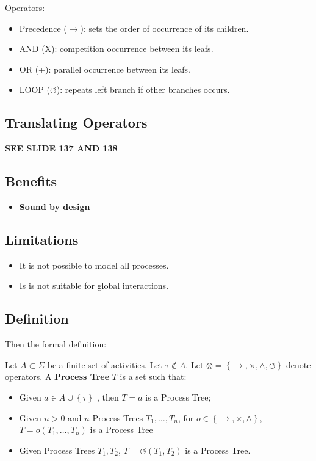 Operators:
\begin{itemize}
	\item Precedence ($\to $): sets the order of occurrence of its children.
	\item AND (X): competition occurrence between its leafs.
	\item OR (+): parallel occurrence between its leafs.
	\item LOOP ($\circlearrowleft$):  repeats left branch if other branches occurs.
\end{itemize}

\subsection*{Translating Operators}

\textbf{SEE SLIDE 137 AND 138}

\subsection*{Benefits}

\begin{itemize}
	\item \textbf{Sound by design}
\end{itemize}

\subsection*{Limitations}

\begin{itemize}
	\item It is not possible to model all processes.
	\item Is is not suitable for global interactions.
\end{itemize}

\subsection*{Definition}

Then the formal definition:

\begin{definition}
	Let $A\subset \Sigma$ be a finite set of activities. Let $\tau \not\in A $. Let $\otimes = \left\{ \to ,\times, \wedge, \circlearrowleft \right\} $ denote operators. A \textbf{Process Tree} $T$ is a set such that:
	\begin{itemize}
		\item Given $a\in A\cup \left\{ \tau \right\}$ , then $T=a$ is a Process Tree;
		\item Given $n > 0$ and $n$ Process Trees $T_1,\ldots,T_n$, for $o\in \left\{ \to , \times , \wedge \right\} $, $T=o(T_1,\ldots,T_n)$ is a Process Tree
		\item Given Process Trees $T_1,T_2$, $T=\circlearrowleft(T_1, T_2)$ is a Process Tree.
	\end{itemize}
	
\end{definition}

